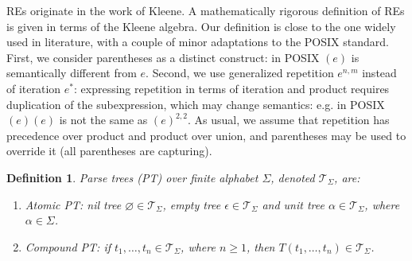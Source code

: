 \documentclass[AMA,STIX1COL]{WileyNJD-v2}
\newcommand{\XT}{\mathcal{T}}
\newtheorem{Xdef}{Definition}
\begin{document}
REs originate in the work of Kleene\cite{Kle51}.
A mathematically rigorous definition of REs is given in terms of the Kleene algebra\cite{Koz94}.
Our definition is close to the one widely used in literature\cite{HU90}\cite{SS88},
with a couple of minor adaptations to the POSIX standard.
First, we consider parentheses as a distinct construct: in POSIX $(e)$ is semantically different from $e$.
Second, we use generalized repetition $e^{n, m}$ instead of iteration $e^*$:
expressing repetition in terms of iteration and product requires duplication of the subexpression,
which may change semantics: e.g. in POSIX $(e)(e)$ is not the same as $(e)^{2,2}$.
As usual, we assume that repetition has precedence over product and product over union,
and parentheses may be used to override it (all parentheses are capturing).

    \begin{Xdef}
    \emph{Parse trees (PT)} over finite alphabet $\Sigma$, denoted $\XT_\Sigma$, are:
    \begin{enumerate}
        \item Atomic PT:
          \emph{nil tree} ${\varnothing} \in \XT_\Sigma$,
          \emph{empty tree} ${\epsilon} \in \XT_\Sigma$ and
          \emph{unit tree} ${\alpha} \in \XT_\Sigma$, where $\alpha \in \Sigma$.
        \item Compound PT: if $t_1, \dots, t_n \in \XT_\Sigma$, where $n \geq 1$, then
          ${T}(t_1, \dots, t_n) \in \XT_\Sigma$.
    \end{enumerate}
    \end{Xdef}
\end{document}
